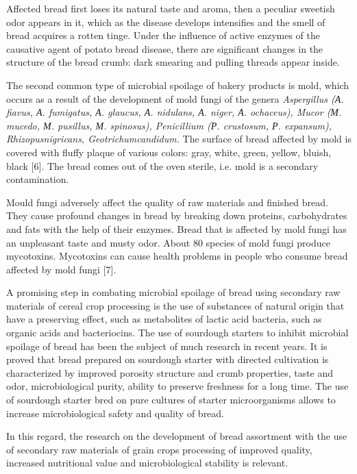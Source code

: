 \begin{multicols}{2}
Affected bread first loses its natural taste and aroma, then a peculiar
sweetish odor appears in it, which as the disease develops intensifies
and the smell of bread acquires a rotten tinge. Under the influence of
active enzymes of the causative agent of potato bread disease, there are
significant changes in the structure of the bread crumb: dark smearing
and pulling threads appear inside.

The second common type of microbial spoilage of bakery products is mold,
which occurs as a result of the development of mold fungi of the genera
\emph{Aspergillus (А. fiavus, А. fumigatus, А. glaucus, А. nidulans, А.
niger, А. ochaceus), Mucor (М. mucedo, М. pusillus, М. spinosus),
Penicillium (Р. crustosum, Р. expansum), Rhizopusnigricans,
Geotrichumcandidum.} The surface of bread affected by mold is covered
with fluffy plaque of various colors: gray, white, green, yellow,
bluish, black {[}6{]}. The bread comes out of the oven sterile, i.e.
mold is a secondary contamination.

Mould fungi adversely affect the quality of raw materials and finished
bread. They cause profound changes in bread by breaking down proteins,
carbohydrates and fats with the help of their enzymes. Bread that is
affected by mold fungi has an unpleasant taste and musty odor. About 80
species of mold fungi produce mycotoxins. Mycotoxins can cause health
problems in people who consume bread affected by mold fungi {[}7{]}.

A promising step in combating microbial spoilage of bread using
secondary raw materials of cereal crop processing is the use of
substances of natural origin that have a preserving effect, such as
metabolites of lactic acid bacteria, such as organic acids and
bacteriocins. The use of sourdough starters to inhibit microbial
spoilage of bread has been the subject of much research in recent years.
It is proved that bread prepared on sourdough starter with directed
cultivation is characterized by improved porosity structure and crumb
properties, taste and odor, microbiological purity, ability to preserve
freshness for a long time. The use of sourdough starter bred on pure
cultures of starter microorganisms allows to increase microbiological
safety and quality of bread.

In this regard, the research on the development of bread assortment with
the use of secondary raw materials of grain crops processing of improved
quality, increased nutritional value and microbiological stability is
relevant.


\end{multicols}
